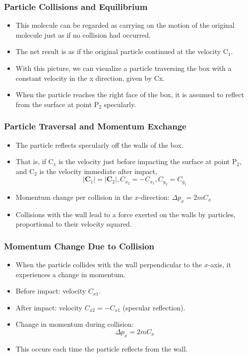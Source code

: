 \documentclass{beamer}
\begin{document}
\begin{frame}
\frametitle{Particle Collisions and Equilibrium}
\begin{itemize}
\item This molecule can be regarded as carrying on
the motion of the original molecule just as if no collision had occurred.
\item The net result is as if the original particle continued at the velocity C$_1$. 
\item With this picture, we can visualize a particle traversing the box with a constant velocity in the x direction, given by Cx.
\item When the particle reaches the right face of the box, it is assumed to reflect from the surface at point P$_2$ specularly.
  
\end{itemize}
\end{frame}

\begin{frame}
\frametitle{Particle Traversal and Momentum Exchange}
\begin{itemize}

    \item The particle reflects specularly off the walls of the box.
    \item That is, if C$_1$ is the velocity just before impacting the surface at point P$_2$, and C$_2$ is the velocity immediate after impact, 
    $$
    \left|\boldsymbol{C}_1\right|=\left|\boldsymbol{C}_2\right|, C_{x_2}=-C_{x_1}, C_{y_2}=C_{y_1}
    $$
    \item Momentum change per collision in the $x$-direction: $\Delta p_x = 2mC_x$
    \item Collisions with the wall lead to a force exerted on the walls by particles, proportional to their velocity squared.
\end{itemize}
\end{frame}




\begin{frame}
\frametitle{Momentum Change Due to Collision}
\begin{itemize}
    \item When the particle collides with the wall perpendicular to the $x$-axis, it experiences a change in momentum.
    \item Before impact: velocity $C_{x1}$.
    \item After impact: velocity $C_{x2} = -C_{x1}$ (specular reflection).
    \item Change in momentum during collision:
    \[
    \Delta p_x = 2mC_x
    \]
    \item This occurs each time the particle reflects from the wall.
\end{itemize}
\end{frame}
\end{document}
